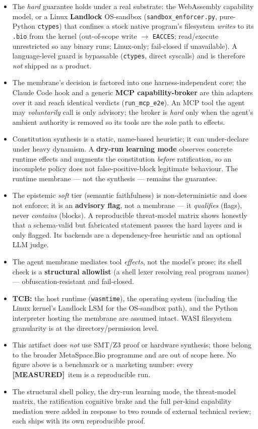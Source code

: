 \documentclass[10pt,a4paper]{article}
\newcommand{\code}[1]{\texttt{\footnotesize #1}}
\newcommand{\measured}{\textcolor{msblue}{\scriptsize\textbf{[MEASURED]}}}
\newcommand{\sect}[1]{\par\vspace{4pt}{\sffamily\bfseries\color{msblue}\normalsize #1}\par\vspace{1pt}}
\begin{document}
\sect{6.\quad Scope, trust boundary \& honest limits}
\begin{itemize}
\item The \emph{hard} guarantee holds under a real substrate: the WebAssembly capability model, or a
Linux \textbf{Landlock} OS-sandbox (\code{sandbox\_enforcer.py}, pure-Python \code{ctypes}) that
confines a stock native program's filesystem \emph{writes} to its \code{.bio} from the kernel
(out-of-scope write $\to$ \code{EACCES}; read/execute unrestricted so any binary runs; Linux-only;
fail-closed if unavailable). A language-level guard is bypassable (\code{ctypes}, direct syscalls)
and is therefore \emph{not} shipped as a product.
\item The membrane's decision is factored into one harness-independent core; the Claude Code hook
and a generic \textbf{MCP capability-broker} are thin adapters over it and reach identical verdicts
(\code{run\_mcp\_e2e}). An MCP tool the agent may \emph{voluntarily} call is only advisory; the
broker is \emph{hard} only when the agent's ambient authority is removed so its tools are the sole
path to effects.
\item Constitution synthesis is a static, name-based heuristic; it can under-declare under heavy
dynamism. A \textbf{dry-run learning mode} observes concrete runtime effects and augments the
constitution \emph{before} ratification, so an incomplete policy does not false-positive-block
legitimate behaviour. The runtime membrane --- not the synthesis --- remains the guarantee.
\item The epistemic \emph{soft} tier (semantic faithfulness) is non-deterministic and does not
enforce; it is an \textbf{advisory flag}, not a membrane --- it \emph{qualifies} (flags), never
\emph{contains} (blocks). A reproducible threat-model matrix shows honestly that a schema-valid but
fabricated statement passes the hard layers and is only flagged. Its backends are a dependency-free
heuristic and an optional LLM judge.
\item The agent membrane mediates tool \emph{effects}, not the model's prose; its shell check is a
\textbf{structural allowlist} (a shell lexer resolving real program names) --- obfuscation-resistant
and fail-closed.
\item \textbf{TCB:} the host runtime (\code{wasmtime}), the operating system (including the Linux
kernel's Landlock LSM for the OS-sandbox path), and the Python interpreter hosting the membrane are
assumed intact. WASI filesystem granularity is at the directory/permission level.
\item This artifact does \emph{not} use SMT/Z3 proof or hardware synthesis; those belong to the
broader MetaSpace.Bio programme and are out of scope here. No figure above is a benchmark or a
marketing number: every \measured\ item is a reproducible run.
\item The structural shell policy, the dry-run learning mode, the threat-model matrix, the
ratification cognitive brake and the full per-kind capability mediation were added in response to
two rounds of external technical review; each ships with its own reproducible proof.
\end{itemize}
\end{document}
